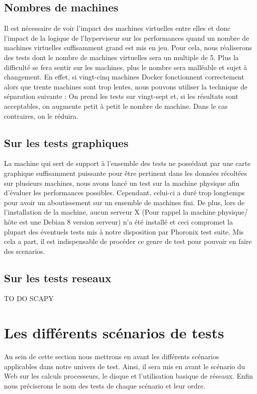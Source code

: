 \subsection{Nombres de machines}
Il est nécessaire de voir l'impact des machines virtuelles entre elles et donc l'impact de la logique de l'hyperviseur sur les performances quand un nombre de machines virtuelles suffisamment grand est mis en jeu. Pour cela, nous réaliserons des tests dont le nombre de machines virtuelles sera un multiple de 5. Plus la difficulté se fera sentir sur les machines, plus le nombre sera malléable et sujet à changement. En effet, si vingt-cinq machines Docker fonctionnent correctement alors que trente machines sont trop lentes, nous pouvons utiliser la technique de séparation suivante : On prend les tests sur vingt-sept et, si les résultats sont acceptables, on augmente petit à petit le nombre de machine. Dans le cas contraires, on le réduira.  

\subsection{Sur les tests graphiques}
La machine qui sert de support à l'ensemble des tests ne possédant par une carte graphique suffisamment puissante pour être pertinent dans les données récoltées sur plusieurs machines, nous avons lancé un test sur la machine physique afin d’évaluer les performances possibles. Cependant, celui-ci a duré trop longtemps pour avoir un aboutissement sur un ensemble de machines fini. De plus, lors de l'installation de la machine, aucun serveur X (Pour rappel la machine physique/ hôte est une Debian 8 version serveur) n'a été installé et ceci compromet la plupart des éventuels tests mis à notre disposition par Phoronix test suite. Mis cela a part, il est indispensable de procéder ce genre de test pour pouvoir en faire des scenarios.


\subsection{Sur les tests reseaux}
TO DO SCAPY


\section{Les différents scénarios de tests}
Au sein de cette section nous mettrons en avant les différents scénarios applicables dans notre univers de test. Ainsi, il sera mis en avant le scénario du Web sur les calculs processeurs, le disque et l'utilisation basique de réseaux. Enfin nous préciserons le nom des tests de chaque scénario et leur ordre. 

